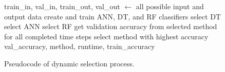 \documentclass[12pt]{uthesis-v12}  %
\begin{document}
\begin{figure}
\begin{algorithmic}[1]
\STATE train\_in, val\_in, train\_out, val\_out $\leftarrow$ all possible input and output data	
\STATE create and train ANN, DT, and RF classifiers
	\STATE select DT
\ELSE
		\STATE select ANN
	\ELSE
		\STATE select RF
	\ENDIF
\ENDIF		
{}
	\STATE get validation accuracy from selected method for all completed time steps
		\STATE select method with highest accuracy
	\ENDIF	
\ENDFOR		
\RETURN val\_accuracy, method, runtime, train\_accuracy
\label{full-alg-dagsi2-2}
\end{algorithmic}
\caption{Pseudocode of dynamic selection process.} 
\label{full-alg-dagsi2-2}
\end{figure}	
\end{document}
